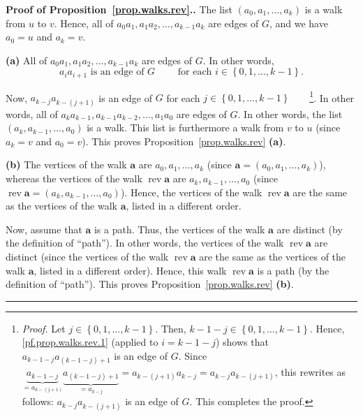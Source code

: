 \documentclass[numbers=enddot,12pt,final,onecolumn,notitlepage]{scrartcl}%
\theoremstyle{definition}
\newenvironment{proof}[1][Proof]{\noindent\textbf{#1.} }{\ \rule{0.5em}{0.5em}}
\newcommand{\rev}{\operatorname{rev}}
\newcommand{\set}[1]{\left\{ #1 \right\}}
\newcommand{\tup}[1]{\left( #1 \right)}
\begin{document}
\begin{proof}[Proof of Proposition~\ref{prop.walks.rev}.]
The list $\tup{a_0, a_1, \ldots, a_k}$ is a walk from $u$ to $v$.
Hence, all of $a_0 a_1, a_1 a_2, \ldots, a_{k-1} a_k$ are edges of
$G$, and we have $a_0 = u$ and $a_k = v$.

\textbf{(a)} All of $a_0 a_1, a_1 a_2, \ldots, a_{k-1} a_k$ are edges
of $G$. In other words,
\begin{equation}
a_i a_{i+1} \text{ is an edge of } G
\qquad \text{ for each } i \in \set{0, 1, \ldots, k-1} .
\label{pf.prop.walks.rev.1}
\end{equation}

Now, $a_{k-j} a_{k-\tup{j+1}}$ is an edge of $G$ for each
$j \in \set{0, 1, \ldots, k-1}$\ \ \ \ \footnote{\textit{Proof.} Let
$j \in \set{0, 1, \ldots, k-1}$. Then,
$k-1-j \in \set{0, 1, \ldots, k-1}$. Hence,
\eqref{pf.prop.walks.rev.1} (applied to $i=k-1-j$) shows that
$a_{k-1-j} a_{\tup{k-1-j}+1}$ is an edge of $G$. Since
$\underbrace{a_{k-1-j}}_{= a_{k-\tup{j+1}}}
\underbrace{a_{\tup{k-1-j}+1}}_{= a_{k-j}}
= a_{k-\tup{j+1}} a_{k-j} = a_{k-j} a_{k-\tup{j+1}}$,
this rewrites as follows: $a_{k-j} a_{k-\tup{j+1}}$ is an edge of $G$.
This completes the proof.}. In other words, all of
$a_k a_{k-1}, a_{k-1} a_{k-2}, \ldots, a_1 a_0$ are edges of $G$.
In other words, the list $\tup{a_k, a_{k-1}, \ldots, a_0}$ is a walk.
This list is furthermore a walk from $v$ to $u$ (since $a_k = v$ and
$a_0 = v$). This proves Proposition~\ref{prop.walks.rev} \textbf{(a)}.

\textbf{(b)} The vertices of the walk $\mathbf{a}$ are
$a_0, a_1, \ldots, a_k$
(since $\mathbf{a} = \tup{a_0, a_1, \ldots, a_k}$),
whereas the vertices of the walk $\rev \mathbf{a}$ are
$a_k, a_{k-1}, \ldots, a_0$
(since $\rev \mathbf{a} = \tup{a_k, a_{k-1}, \ldots, a_0}$). Hence,
the vertices of the walk $\rev \mathbf{a}$ are the same as the
vertices of the walk $\mathbf{a}$, listed in a different order.

Now, assume that $\mathbf{a}$ is a path. Thus, the vertices of the
walk $\mathbf{a}$ are distinct (by the definition of ``path''). In
other words, the vertices of the walk $\rev \mathbf{a}$ are distinct
(since the vertices of the walk $\rev \mathbf{a}$ are the same as the
vertices of the walk $\mathbf{a}$, listed in a different order).
Hence, this walk $\rev \mathbf{a}$ is a path (by the definition of
``path''). This proves Proposition~\ref{prop.walks.rev} \textbf{(b)}.
\end{proof}
\end{document}
